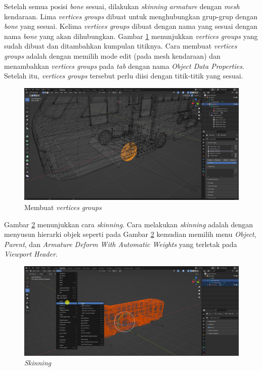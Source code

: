
Setelah semua posisi \textit{bone} sesuai, dilakukan \textit{skinning}
\textit{armature} dengan \textit{mesh} kendaraan. Lima \textit{vertices groups}
dibuat untuk menghubungkan grup-grup dengan \textit{bone} yang sesuai. Kelima
\textit{vertices groups} dibuat dengan nama yang sesuai dengan nama
\textit{bone} yang akan dihubungkan. Gambar \ref{fig:vertices-groups}
menunjukkan \textit{vertices groups} yang sudah dibuat dan ditambahkan kumpulan
titiknya. Cara membuat \textit{vertices groups} adalah dengan memilih mode edit
(pada mesh kendaraan) dan menambahkan \textit{vertices groups} pada \textit{tab}
dengan nama \textit{Object Data Properties}. Setelah itu, \textit{vertices
groups} tersebut perlu diisi dengan titik-titik yang sesuai.

\begin{figure}[!h]
	\centering
    \includegraphics[width=1\textwidth]{resources/chapter-4/vertices-groups.png}
    \caption{Membuat \textit{vertices groups}}
	\label{fig:vertices-groups}
\end{figure}

Gambar \ref{fig:skinning-process} menunjukkan cara \textit{skinning}. Cara
melakukan \textit{skinning} adalah dengan menyusun hierarki objek seperti pada
Gambar \ref{fig:skinning-process} kemudian memilih menu \textit{Object},
\textit{Parent}, dan \textit{Armature Deform With Automatic Weights}
yang terletak pada \textit{Viewport Header}.

\begin{figure}[!h]
	\centering
    \includegraphics[width=1\textwidth]{resources/chapter-4/skining.png}
    \caption{\textit{Skinning}}
	\label{fig:skinning-process}
\end{figure}

